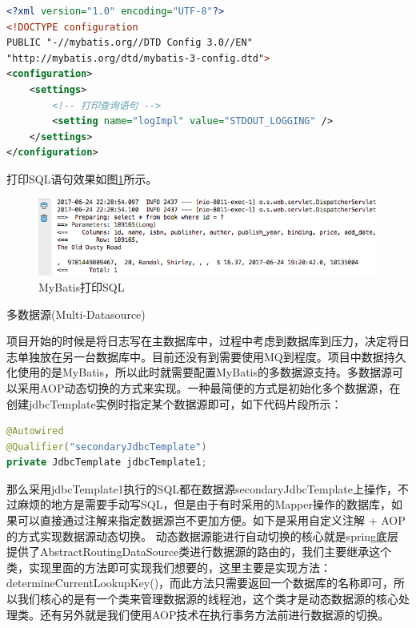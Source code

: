 \documentclass[12pt]{book}
\makeatletter
\numberwithin{dummy}{section}
\theoremstyle{ocrenumbox}
\theoremstyle{blacknumex}
\theoremstyle{blacknumbox}
\theoremstyle{ocrenum}
\renewcommand{\subsection}{\@startsection {subsection}{2}{\z@}
	{-3ex \@plus -0.1ex \@minus -.4ex}
	{0.5ex \@plus.2ex }
	{\normalfont\sffamily\bfseries}}
\makeatother
\begin{document}
\begin{lstlisting}[language=XML]
<?xml version="1.0" encoding="UTF-8"?>
<!DOCTYPE configuration
PUBLIC "-//mybatis.org//DTD Config 3.0//EN"
"http://mybatis.org/dtd/mybatis-3-config.dtd">
<configuration>
	<settings>
		<!-- 打印查询语句 -->
		<setting name="logImpl" value="STDOUT_LOGGING" />
	</settings>
</configuration>
\end{lstlisting}

打印SQL语句效果如图\ref{fig:mybatisprintsql}所示。

\begin{figure}[htbp]
	\centering
	\includegraphics[scale=0.5]{mybatisprintsql.png}
	\caption{MyBatis打印SQL}
	\label{fig:mybatisprintsql}
\end{figure}

\subsection{多数据源(Multi-Datasource)}

项目开始的时候是将日志写在主数据库中，过程中考虑到数据库到压力，决定将日志单独放在另一台数据库中。目前还没有到需要使用MQ到程度。项目中数据持久化使用的是MyBatis，所以此时就需要配置MyBatis的多数据源支持。多数据源可以采用AOP动态切换的方式来实现。一种最简便的方式是初始化多个数据源，在创建jdbcTemplate实例时指定某个数据源即可，如下代码片段所示：

\begin{lstlisting}[language=Java]
@Autowired
@Qualifier("secondaryJdbcTemplate")
private JdbcTemplate jdbcTemplate1;
\end{lstlisting}

那么采用jdbcTemplate1执行的SQL都在数据源secondaryJdbcTemplate上操作，不过麻烦的地方是需要手动写SQL，但是由于有时采用的Mapper操作的数据库，如果可以直接通过注解来指定数据源岂不更加方便。如下是采用自定义注解 + AOP的方式实现数据源动态切换。
动态数据源能进行自动切换的核心就是spring底层提供了AbstractRoutingDataSource类进行数据源的路由的，我们主要继承这个类，实现里面的方法即可实现我们想要的，这里主要是实现方法：determineCurrentLookupKey()，而此方法只需要返回一个数据库的名称即可，所以我们核心的是有一个类来管理数据源的线程池，这个类才是动态数据源的核心处理类。还有另外就是我们使用AOP技术在执行事务方法前进行数据源的切换。
\end{document}
